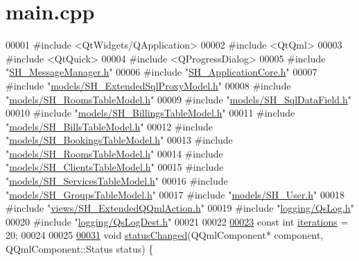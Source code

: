 \hypertarget{main_8cpp_source}{\section{main.\-cpp}
}

\begin{DoxyCode}
00001 \textcolor{preprocessor}{#include <QtWidgets/QApplication>}
00002 \textcolor{preprocessor}{#include <QtQml>}
00003 \textcolor{preprocessor}{#include <QtQuick>}
00004 \textcolor{preprocessor}{#include <QProgressDialog>}
00005 \textcolor{preprocessor}{#include "\hyperlink{SH__MessageManager_8h}{SH\_MessageManager.h}"}
00006 \textcolor{preprocessor}{#include "\hyperlink{SH__ApplicationCore_8h}{SH\_ApplicationCore.h}"}
00007 \textcolor{preprocessor}{#include "\hyperlink{SH__ExtendedSqlProxyModel_8h}{models/SH\_ExtendedSqlProxyModel.h}"}
00008 \textcolor{preprocessor}{#include "\hyperlink{SH__RoomsTableModel_8h}{models/SH\_RoomsTableModel.h}"}
00009 \textcolor{preprocessor}{#include "\hyperlink{SH__SqlDataField_8h}{models/SH\_SqlDataField.h}"}
00010 \textcolor{preprocessor}{#include "\hyperlink{SH__BillingsTableModel_8h}{models/SH\_BillingsTableModel.h}"}
00011 \textcolor{preprocessor}{#include "\hyperlink{SH__BillsTableModel_8h}{models/SH\_BillsTableModel.h}"}
00012 \textcolor{preprocessor}{#include "\hyperlink{SH__BookingsTableModel_8h}{models/SH\_BookingsTableModel.h}"}
00013 \textcolor{preprocessor}{#include "\hyperlink{SH__RoomsTableModel_8h}{models/SH\_RoomsTableModel.h}"}
00014 \textcolor{preprocessor}{#include "\hyperlink{SH__ClientsTableModel_8h}{models/SH\_ClientsTableModel.h}"}
00015 \textcolor{preprocessor}{#include "\hyperlink{SH__ServicesTableModel_8h}{models/SH\_ServicesTableModel.h}"}
00016 \textcolor{preprocessor}{#include "\hyperlink{SH__GroupsTableModel_8h}{models/SH\_GroupsTableModel.h}"}
00017 \textcolor{preprocessor}{#include "\hyperlink{SH__User_8h}{models/SH\_User.h}"}
00018 \textcolor{preprocessor}{#include "\hyperlink{SH__ExtendedQQmlAction_8h}{views/SH\_ExtendedQQmlAction.h}"}
00019 \textcolor{preprocessor}{#include "\hyperlink{QsLog_8h}{logging/QsLog.h}"}
00020 \textcolor{preprocessor}{#include "\hyperlink{QsLogDest_8h}{logging/QsLogDest.h}"}
00021 
00022 
\hypertarget{main_8cpp_source_l00023}{}\hyperlink{main_8cpp_aab83ac6564fd72e82c62b21733ca0e1b}{00023} \textcolor{keyword}{const} \textcolor{keywordtype}{int} \hyperlink{main_8cpp_aab83ac6564fd72e82c62b21733ca0e1b}{iterations} = 20;
00024 
00025 
\hypertarget{main_8cpp_source_l00031}{}\hyperlink{main_8cpp_aaf7c4666a49fc2890c12b6ae393b8deb}{00031} \textcolor{keywordtype}{void} \hyperlink{main_8cpp_aaf7c4666a49fc2890c12b6ae393b8deb}{statusChanged}(QQmlComponent* component, QQmlComponent::Status status) \{

\end{DoxyCode}
